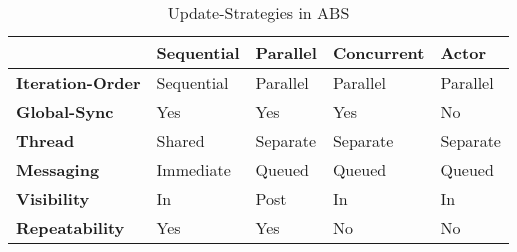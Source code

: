 \begin{table*}[t]
\centering
\caption{Update-Strategies in ABS}
\label{tab:update_strategies}
\begin{tabular}{l || l | l | l | l }
	 			& \textbf{Sequential} 	& \textbf{Parallel} 	& \textbf{Concurrent}	& \textbf{Actor}  	\\ \hline \hline

\textbf{Iteration-Order}	& Sequential	& Parallel	& Parallel		& Parallel	\\  
\textbf{Global-Sync}		& Yes			& Yes		& Yes			& No		\\  
\textbf{Thread}				& Shared		& Separate	& Separate		& Separate	\\  
\textbf{Messaging}			& Immediate		& Queued	& Queued		& Queued	\\  
\textbf{Visibility}			& In			& Post		& In			& In		\\  
\textbf{Repeatability}		& Yes			& Yes		& No			& No		\\ 

\end{tabular}
\end{table*}